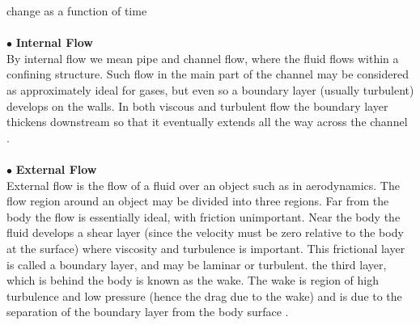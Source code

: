 change as a function of time \cite{hughes}
\\\\
\noindent $\bullet$ \textbf{Internal Flow} \\
By internal flow we mean pipe and channel flow, where the fluid flows
within a confining structure.  Such flow in the main part of the channel
may be considered as approximately ideal for gases, but even so a 
boundary layer (usually turbulent) develops on the walls.  In both
viscous and turbulent flow the boundary layer thickens downstream so
that it eventually extends all the way across the channel \cite{hughes}.
\\\\ 
\noindent $\bullet$ \textbf{External Flow} \\
External flow is the flow of a fluid over an object such as in 
aerodynamics.  The flow region around an object may be divided into 
three regions.  Far from the body the flow is essentially ideal, with
friction unimportant.  Near the body the fluid develops a shear layer 
(since the velocity must be zero relative to the body at the surface)
where viscosity and turbulence is important.  This frictional layer is
called a boundary layer, and may be laminar or turbulent.  the third 
layer, which is behind the body is known as the wake.  The wake is 
region of high turbulence and low pressure (hence the drag due to 
the wake) and is due to the separation of the boundary layer from 
the body surface \cite{hughes}.    








